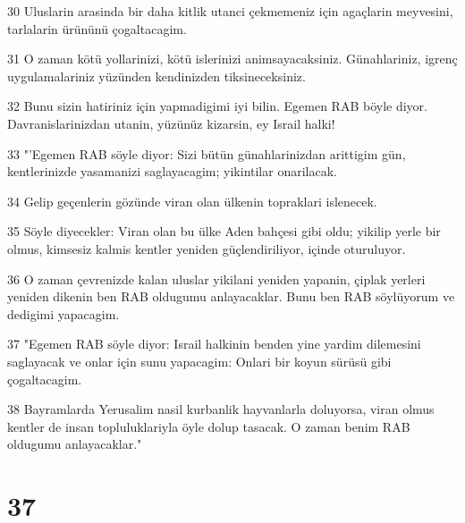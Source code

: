\par 30 Uluslarin arasinda bir daha kitlik utanci çekmemeniz için agaçlarin meyvesini, tarlalarin ürününü çogaltacagim.
\par 31 O zaman kötü yollarinizi, kötü islerinizi animsayacaksiniz. Günahlariniz, igrenç uygulamalariniz yüzünden kendinizden tiksineceksiniz.
\par 32 Bunu sizin hatiriniz için yapmadigimi iyi bilin. Egemen RAB böyle diyor. Davranislarinizdan utanin, yüzünüz kizarsin, ey Israil halki!
\par 33 "'Egemen RAB söyle diyor: Sizi bütün günahlarinizdan arittigim gün, kentlerinizde yasamanizi saglayacagim; yikintilar onarilacak.
\par 34 Gelip geçenlerin gözünde viran olan ülkenin topraklari islenecek.
\par 35 Söyle diyecekler: Viran olan bu ülke Aden bahçesi gibi oldu; yikilip yerle bir olmus, kimsesiz kalmis kentler yeniden güçlendiriliyor, içinde oturuluyor.
\par 36 O zaman çevrenizde kalan uluslar yikilani yeniden yapanin, çiplak yerleri yeniden dikenin ben RAB oldugumu anlayacaklar. Bunu ben RAB söylüyorum ve dedigimi yapacagim.
\par 37 "Egemen RAB söyle diyor: Israil halkinin benden yine yardim dilemesini saglayacak ve onlar için sunu yapacagim: Onlari bir koyun sürüsü gibi çogaltacagim.
\par 38 Bayramlarda Yerusalim nasil kurbanlik hayvanlarla doluyorsa, viran olmus kentler de insan topluluklariyla öyle dolup tasacak. O zaman benim RAB oldugumu anlayacaklar."

\chapter{37}

